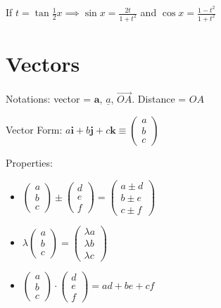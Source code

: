 \documentclass[10pt,a4paper,oneside]{book}
\begin{document}
If $t=\tan \frac{1}{2}x \implies \sin x = \frac{2t}{1+t^2}$ and $\cos x = \frac{1-t^2}{1+t^2}$

\section*{Vectors}
Notations: vector = $\textbf{a}$, $\underline{a}$, $\overrightarrow{OA}$. Distance = $OA$

Vector Form: $a\textbf{i}+b\textbf{j}+c\textbf{k}\equiv \begin{pmatrix}
    a\\b\\c  
\end{pmatrix}$

Properties:
\begin{itemize}
    \item $\begin{pmatrix}
        a\\b\\c
    \end{pmatrix}\pm \begin{pmatrix}
        d\\e\\f 
    \end{pmatrix}=\begin{pmatrix}
        a \pm d \\
        b \pm e \\
        c \pm f 
    \end{pmatrix}$

    \item $\lambda\begin{pmatrix}
        a\\b\\c 
    \end{pmatrix}=\begin{pmatrix}
        \lambda a\\\lambda b\\\lambda c 
    \end{pmatrix}$

    \item $\begin{pmatrix}
        a\\b\\c
    \end{pmatrix}\cdot \begin{pmatrix}
        d\\e\\f
    \end{pmatrix}=ad+be+cf$
\end{itemize}
\end{document}
